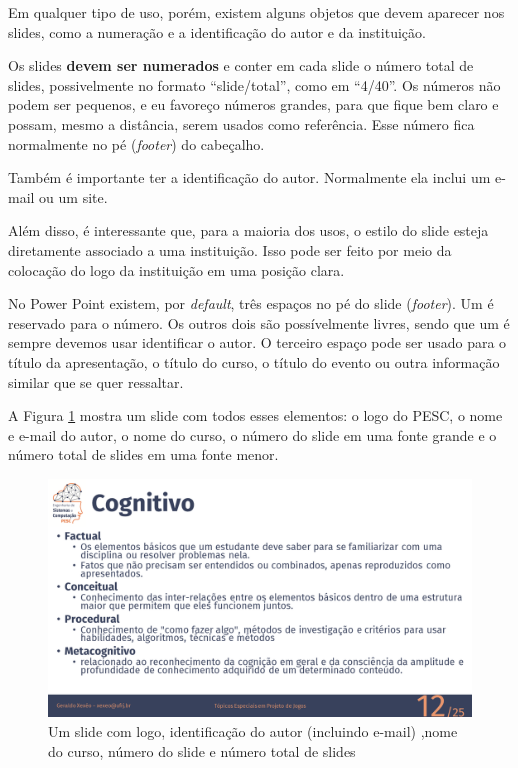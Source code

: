Em qualquer tipo de uso, porém, existem alguns objetos que devem aparecer nos slides, como a numeração e a identificação do autor e da instituição.

Os slides \textbf{devem ser numerados} e conter em cada slide o número total de slides, possivelmente no formato ``slide/total'', como em ``4/40''. Os números não podem ser pequenos, e eu favoreço números grandes, para que fique bem claro e possam, mesmo a distância, serem usados como referência. Esse número fica normalmente no pé (\textit{footer}) do cabeçalho.

Também é importante ter a identificação do autor. Normalmente ela inclui um e-mail ou um site.

Além disso, é interessante que, para a maioria dos usos, o estilo do slide esteja diretamente associado a uma instituição. Isso pode ser feito por meio da colocação do logo da instituição em uma posição clara.

No Power Point existem, por \textit{default}, três espaços no pé do slide (\textit{footer}). Um é reservado para o número. Os outros dois são possívelmente livres, sendo que um é sempre devemos usar identificar o autor. O terceiro espaço pode ser usado para o título da apresentação, o título do curso, o título do evento ou outra informação similar que se quer ressaltar.

A Figura \ref{fig:coppe} mostra um slide com todos esses elementos: o logo do PESC, o nome e e-mail do autor, o nome do curso, o número do slide em uma fonte grande e o número total de slides em uma fonte menor.

\begin{figure}[htb]
    \centering
    \includegraphics[width=\tam\linewidth]{imagens/slideexemplotepj.png}
    \caption{Um slide com logo, identificação do autor (incluindo e-mail) ,nome do curso,   número do slide e número total de slides}
    \label{fig:coppe}
\end{figure}

